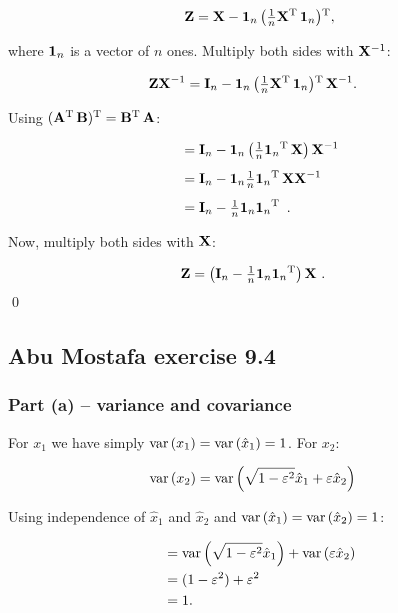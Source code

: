 \begin{align*}
  \mbf Z = \mbf X - \one \left(\tfrac{1}{n}\mbf X \T \one\right)\T,
\end{align*}

where $\one$ is a vector of $n$ ones. Multiply both sides with $\mbf X^{-1}$:

\begin{align*}
  \mbf Z \mbf X^{-1} &= \id - \one \left(\tfrac{1}{n}\mbf X \T \one\right)\T \mbf
  X^{-1}.
\end{align*}

Using $(\mbf A\T \mbf B) \T = \mbf B \T \mbf A$:

\begin{align*}
  &= \id - \one \left(\tfrac{1}{n}\one\T \mbf X\right) \mbf X^{-1}\\[4pt]
  &= \id - \one \tfrac{1}{n}\one\T \mbf X \mbf X^{-1}\\[4pt]
 &= \id - \tfrac{1}{n}\one \one\T\ .
\end{align*}

Now, multiply both sides with $\mbf X$:

\begin{align*}
  \mbf Z &= \left(\id - \tfrac{1}{n}\one \one\T\right) \mbf X\ .
\end{align*}
\qed

\subsection{Abu Mostafa exercise 9.4}
\subsubsection{Part (a) -- variance and covariance}

For $x_1$ we have simply $\var{x_1} = \var{\hat x_1} = 1$. For $x_2$:

\begin{align*}
  \var{x_2} &= \var{\sqrt{1 - \eps^2}\hat x_1 + \eps\hat x_2}
\end{align*}

Using independence of $\hat x_1$ and $\hat x_2$ and $\var{\hat x_1} = \var{\hat
x_2} = 1$:

\begin{align*}
  &= \var{\sqrt{1 - \eps^2} \hat x_1} + \var{\eps \hat x_2}\\
  &= (1 - \eps^2) + \eps^2\\&= 1.\\
\end{align*}

